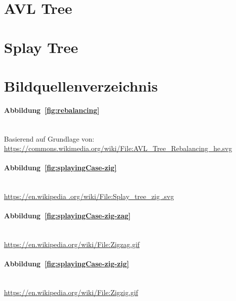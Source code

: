 \documentclass[a4paper]{article}
\begin{document}
    \section{AVL Tree}\label{sec:avl-tree}
    


    \section{Splay Tree}\label{sec:splay-tree}
    

    \newpage
    \appendix


    \section{Bildquellenverzeichnis}\label{sec:bildquellen}

    \paragraph{Abbildung~\ref{fig:rebalancing}}\mbox{}\\

    Basierend auf Grundlage von:\\
    \url{https://commons.wikimedia.org/wiki/File:AVL_Tree_Rebalancing_he.svg}

    \paragraph{Abbildung~\ref{fig:splayingCase-zig}}\mbox{}\\

    \url{https://en.wikipedia .org/wiki/File:Splay_tree_zig .svg}

    \paragraph{Abbildung~\ref{fig:splayingCase-zig-zag}}\mbox{}\\

    \url{https://en.wikipedia.org/wiki/File:Zigzag.gif}

    \paragraph{Abbildung~\ref{fig:splayingCase-zig-zig}}\mbox{}\\

    \url{https://en.wikipedia.org/wiki/File:Zigzig.gif}
\end{document}
